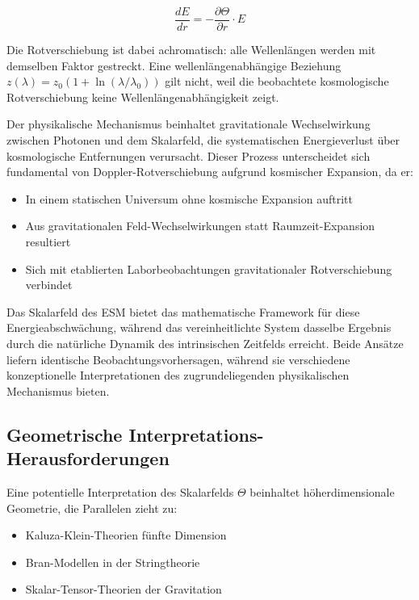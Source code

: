	\begin{equation}
		\frac{dE}{dr} = -\frac{\partial \Theta}{\partial r} \cdot E
	\end{equation}
	
	Die Rotverschiebung ist dabei achromatisch: alle Wellenlängen werden mit demselben Faktor gestreckt. Eine wellenlängenabhängige Beziehung $z(\lambda) = z_0(1 + \ln(\lambda/\lambda_0))$ gilt nicht, weil die beobachtete kosmologische Rotverschiebung keine Wellenlängenabhängigkeit zeigt.
	
	Der physikalische Mechanismus beinhaltet gravitationale Wechselwirkung zwischen Photonen und dem Skalarfeld, die systematischen Energieverlust über kosmologische Entfernungen verursacht. Dieser Prozess unterscheidet sich fundamental von Doppler-Rotverschiebung aufgrund kosmischer Expansion, da er:
	
	\begin{itemize}
		\item In einem statischen Universum ohne kosmische Expansion auftritt
		\item Aus gravitationalen Feld-Wechselwirkungen statt Raumzeit-Expansion resultiert
		\item Sich mit etablierten Laborbeobachtungen gravitationaler Rotverschiebung verbindet
	\end{itemize}
	
	Das Skalarfeld des ESM bietet das mathematische Framework für diese Energieabschwächung, während das vereinheitlichte System dasselbe Ergebnis durch die natürliche Dynamik des intrinsischen Zeitfelds erreicht. Beide Ansätze liefern identische Beobachtungsvorhersagen, während sie verschiedene konzeptionelle Interpretationen des zugrundeliegenden physikalischen Mechanismus bieten.
	
	\subsection{Geometrische Interpretations-Herausforderungen}
	\label{subsec:geometrical_challenges}
	
	Eine potentielle Interpretation des Skalarfelds $\Theta$ beinhaltet höherdimensionale Geometrie, die Parallelen zieht zu:
	
	\begin{itemize}
		\item Kaluza-Klein-Theorien fünfte Dimension
		\item Bran-Modellen in der Stringtheorie
		\item Skalar-Tensor-Theorien der Gravitation
	\end{itemize}
	
